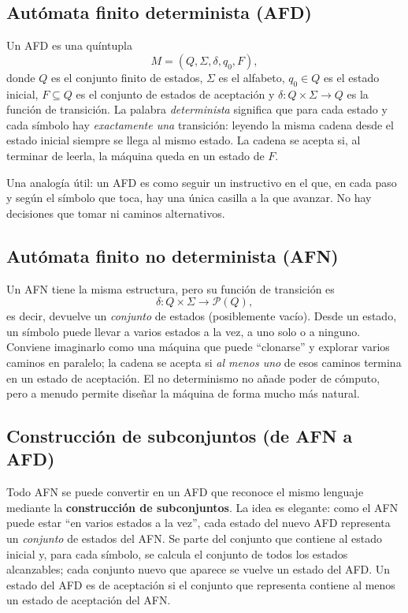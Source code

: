 \documentclass[12pt]{article}
\begin{document}
\subsection{Autómata finito determinista (AFD)}

Un AFD es una quíntupla
\[
M=(Q,\Sigma,\delta,q_0,F),
\]
donde $Q$ es el conjunto finito de estados, $\Sigma$ es el alfabeto, $q_0\in Q$ es el estado inicial, $F\subseteq Q$ es el conjunto de estados de aceptación y $\delta:Q\times\Sigma\to Q$ es la función de transición. La palabra \emph{determinista} significa que para cada estado y cada símbolo hay \emph{exactamente una} transición: leyendo la misma cadena desde el estado inicial siempre se llega al mismo estado. La cadena se acepta si, al terminar de leerla, la máquina queda en un estado de $F$.

Una analogía útil: un AFD es como seguir un instructivo en el que, en cada paso y según el símbolo que toca, hay una única casilla a la que avanzar. No hay decisiones que tomar ni caminos alternativos.

\subsection{Autómata finito no determinista (AFN)}

Un AFN tiene la misma estructura, pero su función de transición es
\[
\delta:Q\times\Sigma\to \mathcal{P}(Q),
\]
es decir, devuelve un \emph{conjunto} de estados (posiblemente vacío). Desde un estado, un símbolo puede llevar a varios estados a la vez, a uno solo o a ninguno. Conviene imaginarlo como una máquina que puede ``clonarse'' y explorar varios caminos en paralelo; la cadena se acepta si \emph{al menos uno} de esos caminos termina en un estado de aceptación. El no determinismo no añade poder de cómputo, pero a menudo permite diseñar la máquina de forma mucho más natural.

\subsection{Construcción de subconjuntos (de AFN a AFD)}

Todo AFN se puede convertir en un AFD que reconoce el mismo lenguaje mediante la \textbf{construcción de subconjuntos}. La idea es elegante: como el AFN puede estar ``en varios estados a la vez'', cada estado del nuevo AFD representa un \emph{conjunto} de estados del AFN. Se parte del conjunto que contiene al estado inicial y, para cada símbolo, se calcula el conjunto de todos los estados alcanzables; cada conjunto nuevo que aparece se vuelve un estado del AFD. Un estado del AFD es de aceptación si el conjunto que representa contiene al menos un estado de aceptación del AFN.
\end{document}
